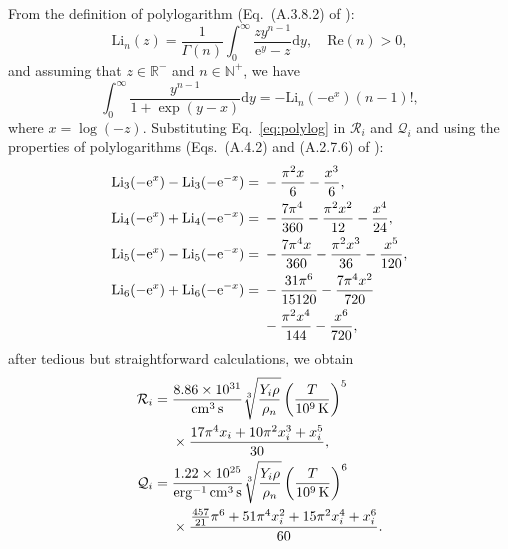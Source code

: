 \documentclass[aps,prd,twocolumn,a4paper,floatfix,nofootbib,superscriptaddress,nofootinbib]{revtex4}
\begin{document}
From the definition of polylogarithm (Eq.~(A.3.8.2) of \citet{Lewin81}):
%
\begin{equation}
\label{eq:polylog-def}
\mathrm{Li}_n(z)=\frac1{\Gamma(n)}\int_0^\infty \frac{zy^{n-1}}{\mathrm e^y-z}\mathrm dy,
\quad \mathrm{Re}(n)>0,
\end{equation}
%
and assuming that $z\in \mathbb R^-$ and $n\in \mathbb N^+$, we have
%
\begin{equation}
\label{eq:polylog}
\int_0^\infty \frac{y^{n-1}}{1+\exp(y-x)}\mathrm dy=-\mathrm{Li}_n(-\mathrm e^x)(n-1)!,
\end{equation}
%
where $x= \log(-z)$.
Substituting Eq.~\eqref{eq:polylog} in $\mathcal R_i$ and $\mathcal Q_i$
and using the properties of polylogarithms
(Eqs.~(A.4.2) and (A.2.7.6) of \citet{Lewin81}):
%
\begin{align}
\mathrm{Li}_3(-\mathrm e^x)-\mathrm{Li}_3(-\mathrm e^{-x})={}&{}-\frac{\pi^2x}6-\frac{x^3}{6},\\
\mathrm{Li}_4(-\mathrm e^x)+\mathrm{Li}_4(-\mathrm e^{-x})={}&{}-\frac{7\pi^4}{360}-\frac{\pi^2x^2}{12}-\frac{x^4}{24},\\
\mathrm{Li}_5(-\mathrm e^x)-\mathrm{Li}_5(-\mathrm e^{-x})={}&{}-\frac{7\pi^4x}{360}-\frac{\pi^2x^3}{36}-\frac{x^5}{120},\\
\mathrm{Li}_6(-\mathrm e^x)+\mathrm{Li}_6(-\mathrm e^{-x})={}&{}-\frac{31\pi^6}{15120}-\frac{7\pi^4x^2}{720}\notag\\
&{}-\frac{\pi^2x^4}{144}-\frac{x^6}{720},
\end{align}
%
after tedious but straightforward calculations, we obtain
%
\begin{align}
\label{eq:Rinonlin}
\mathcal R_i={}& \frac{8.86\times 10^{31}}{\unit{cm^{3}\,s}}
\sqrt[3]{\frac{Y_i\rho}{\rho_n}} \left(\frac{T}{\unit[10^9]{K}}\right)^5\notag\\
{}&\times\frac{17\pi^4x_i+10\pi^2x_i^3+x_i^5}{30},\\
%
\label{eq:Qinonlin}
\mathcal Q_i={}& \frac{1.22\times10^{25}}{\unit{erg^{-1}\,cm^{3}\,s}}
\sqrt[3]{\frac{Y_i\rho}{\rho_n}} \left(\frac{T}{\unit[10^9]{K}}\right)^6\notag\\
{}&\times\frac{\frac{457}{21}\pi^6 + 51\pi^4x_i^2 + 15\pi^2x_i^4 + x_i^6}{60}.
%
\end{align}
\end{document}
